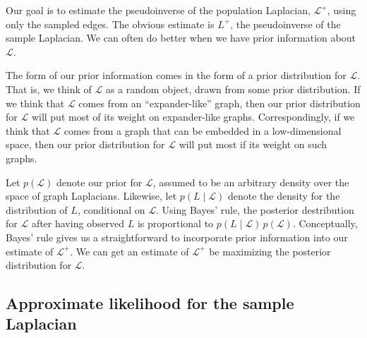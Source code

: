 \documentclass[12pt]{article}
\theoremstyle{plain}
\begin{document}
Our goal is to estimate the pseudoinverse of the population Laplacian,
$\mathcal{L}^{+}$, using only the sampled edges.  The obvious estimate
is $L^{+}$, the pseudoinverse of the sample Laplacian.  We can often
do better when we have prior information about $\mathcal{L}$.

The form of our prior information comes in the form of a prior distribution
for $\mathcal{L}$.  That is, we think of $\mathcal{L}$ as a random
object, drawn from some prior distribution.  If we think that
$\mathcal{L}$ comes from an ``expander-like'' graph, then our prior
distribution for $\mathcal{L}$ will put most of its weight on
expander-like graphs.  Correspondingly, if we think that $\mathcal{L}$
comes from a graph that can be embedded in a low-dimensional space,
then our prior distribution for $\mathcal{L}$ will put most if its
weight on such graphs.

Let $p(\mathcal{L})$ denote our prior for $\mathcal{L}$, assumed to be
an arbitrary density over the space of graph Laplacians.  Likewise, let
$p(L \mid \mathcal{L})$ denote the density for the
distribution of $L$, conditional on $\mathcal{L}$.  Using Bayes' rule,
the posterior destribution for $\mathcal{L}$ after having observed $L$
is proportional to $p(L \mid \mathcal{L}) \, p(\mathcal{L})$.
Conceptually, Bayes' rule gives us a straightforward to
incorporate prior information into our estimate of $\mathcal{L}^+$.
We can get an estimate of $\mathcal{L}^{+}$ be maximizing the
posterior distribution for $\mathcal{L}$.

\subsection{Approximate likelihood for the sample Laplacian}
\end{document}
